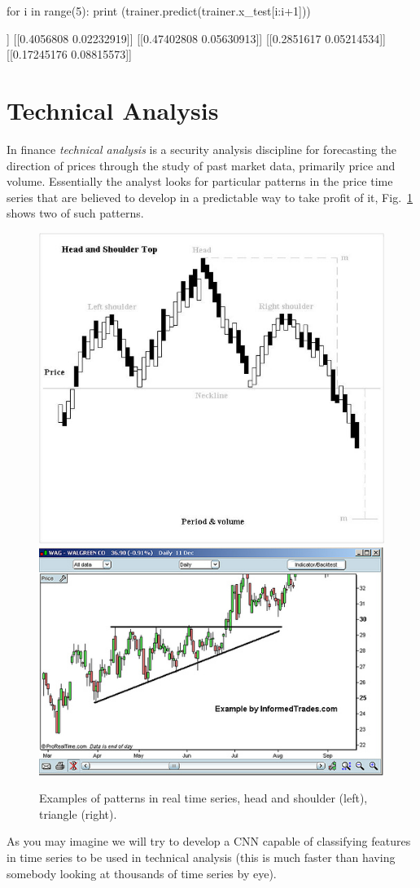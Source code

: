 \begin{ipython}
for i in range(5):
    print (trainer.predict(trainer.x_test[i:i+1]))
\end{ipython}
\begin{ioutput}
[[0.3825101  0.09229672]]
[[0.4056808  0.02232919]]
[[0.47402808 0.05630913]]
[[0.2851617  0.05214534]]
[[0.17245176 0.08815573]]
\end{ioutput}

\section{Technical Analysis}\label{technical-analysis}

In finance \emph{technical analysis} is a security analysis discipline
for forecasting the direction of prices through the study of past market
data, primarily price and volume. Essentially the analyst looks for
particular patterns in the price time series that are believed to
develop in a predictable way to take profit of it, Fig.~\ref{fig:tech_ana} shows two
of such patterns.

\begin{figure}[htb]
	\centering
	\includegraphics[width=0.4\linewidth]{figures/H_and_s_top_new.jpg}\qquad
	\includegraphics[width=0.4\linewidth]{figures/Triangle-ascending.jpg}
	\caption{Examples of patterns in real time series, head and shoulder (left), triangle (right).}
        \label{fig:tech_ana}
\end{figure}

As you may imagine we will try to develop a CNN capable of classifying features 
in time series to be used in technical analysis (this is much faster than having somebody looking at
thousands of time series by eye).

